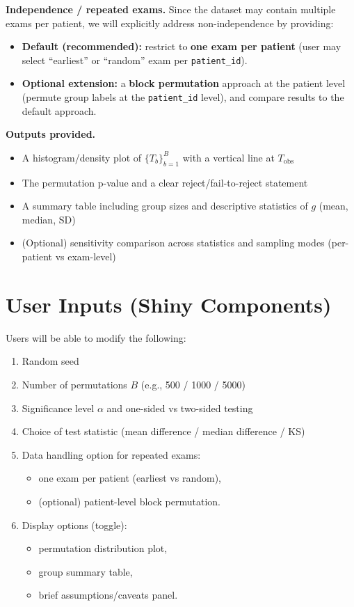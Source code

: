 \documentclass{article}
\begin{document}
\begin{normalsize}
    \noindent \textbf{Independence / repeated exams.} Since the dataset may contain multiple exams per patient, we will explicitly address non-independence by providing:
    \begin{itemize}
        \item \textbf{Default (recommended):} restrict to \textbf{one exam per patient} (user may select ``earliest'' or ``random'' exam per \texttt{patient\_id}).
        \item \textbf{Optional extension:} a \textbf{block permutation} approach at the patient level (permute group labels at the \texttt{patient\_id} level), and compare results to the default approach.
    \end{itemize}

    \noindent \textbf{Outputs provided.}
    \begin{itemize}
        \item A histogram/density plot of $\{T_b\}_{b=1}^B$ with a vertical line at $T_{\text{obs}}$
        \item The permutation p-value and a clear reject/fail-to-reject statement
        \item A summary table including group sizes and descriptive statistics of $g$ (mean, median, SD)
        \item (Optional) sensitivity comparison across statistics and sampling modes (per-patient vs exam-level)
    \end{itemize}

	\section{User Inputs (Shiny Components)}
    Users will be able to modify the following:
    \begin{enumerate}
        \item Random seed
        \item Number of permutations $B$ (e.g., 500 / 1000 / 5000)
        \item Significance level $\alpha$ and one-sided vs two-sided testing
        \item Choice of test statistic (mean difference / median difference / KS)
        \item Data handling option for repeated exams:
            \begin{itemize}
                \item one exam per patient (earliest vs random),
                \item (optional) patient-level block permutation.
            \end{itemize}
        \item Display options (toggle):
            \begin{itemize}
                \item permutation distribution plot,
                \item group summary table,
                \item brief assumptions/caveats panel.
            \end{itemize}
    \end{enumerate}

\end{normalsize}

\nocite{*}


\end{document}
